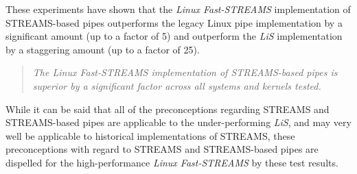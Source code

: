 \documentclass[letterpaper,final,notitlepage,twocolumn,10pt,twoside]{article}
\begin{document}
These experiments have shown that the \textsl{Linux Fast-STREAMS} implementation of STREAMS-based
pipes outperforms the legacy Linux pipe implementation by a significant amount (up to a factor of 5)
and outperform the \textsl{LiS} implementation by a staggering amount (up to a factor of 25).

\begin{quote}
\textit{The \textsl{Linux Fast-STREAMS} implementation of STREAMS-based pipes is superior by a
significant factor across all systems and kernels tested.}
\end{quote}

While it can be said that all of the preconceptions regarding STREAMS and STREAMS-based pipes are
applicable to the under-performing \textsl{LiS}, and may very well be applicable to historical
implementations of STREAMS, these preconceptions with regard to STREAMS and STREAMS-based pipes are
dispelled for the high-performance \textsl{Linux Fast-STREAMS} by these test results.
\end{document}
